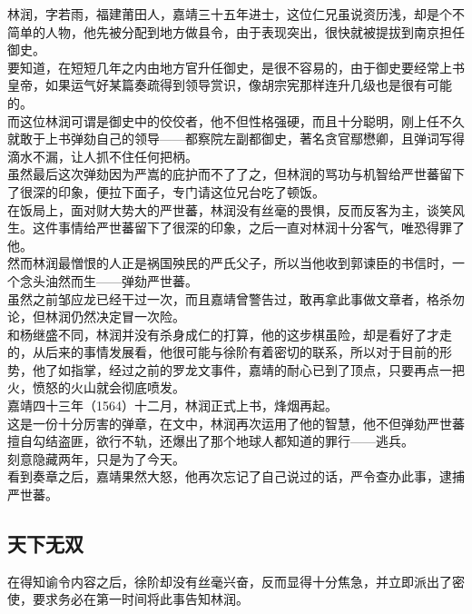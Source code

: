 \begin{multicols}{\theparacolNo}
林润，字若雨，福建莆田人，嘉靖三十五年进士，这位仁兄虽说资历浅，却是个不简单的人物，他先被分配到地方做县令，由于表现突出，很快就被提拔到南京担任御史。\\

要知道，在短短几年之内由地方官升任御史，是很不容易的，由于御史要经常上书皇帝，如果运气好某篇奏疏得到领导赏识，像胡宗宪那样连升几级也是很有可能的。\\

而这位林润可谓是御史中的佼佼者，他不但性格强硬，而且十分聪明，刚上任不久就敢于上书弹劾自己的领导——都察院左副都御史，著名贪官鄢懋卿，且弹词写得滴水不漏，让人抓不住任何把柄。\\

虽然最后这次弹劾因为严嵩的庇护而不了了之，但林润的骂功与机智给严世蕃留下了很深的印象，便拉下面子，专门请这位兄台吃了顿饭。\\

在饭局上，面对财大势大的严世蕃，林润没有丝毫的畏惧，反而反客为主，谈笑风生。这件事情给严世蕃留下了很深的印象，之后一直对林润十分客气，唯恐得罪了他。\\

然而林润最憎恨的人正是祸国殃民的严氏父子，所以当他收到郭谏臣的书信时，一个念头油然而生——弹劾严世蕃。\\

虽然之前邹应龙已经干过一次，而且嘉靖曾警告过，敢再拿此事做文章者，格杀勿论，但林润仍然决定冒一次险。\\

和杨继盛不同，林润并没有杀身成仁的打算，他的这步棋虽险，却是看好了才走的，从后来的事情发展看，他很可能与徐阶有着密切的联系，所以对于目前的形势，他了如指掌，经过之前的罗龙文事件，嘉靖的耐心已到了顶点，只要再点一把火，愤怒的火山就会彻底喷发。\\

嘉靖四十三年（1564）十二月，林润正式上书，烽烟再起。\\

这是一份十分厉害的弹章，在文中，林润再次运用了他的智慧，他不但弹劾严世蕃擅自勾结盗匪，欲行不轨，还爆出了那个地球人都知道的罪行——逃兵。\\

刻意隐藏两年，只是为了今天。\\

看到奏章之后，嘉靖果然大怒，他再次忘记了自己说过的话，严令查办此事，逮捕严世蕃。\\

\subsection{天下无双}
在得知谕令内容之后，徐阶却没有丝毫兴奋，反而显得十分焦急，并立即派出了密使，要求务必在第一时间将此事告知林润。\\


\end{multicols}
